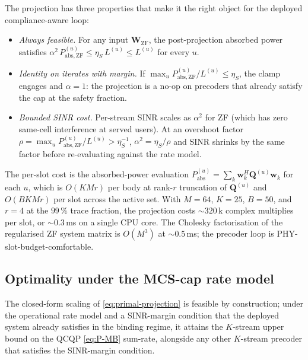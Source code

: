 \documentclass[journal,twocolumn,10pt]{IEEEtran}
\theoremstyle{plain}
\theoremstyle{remark}
\newcommand{\ww}{\mathbf{w}}
\newcommand{\Pabs}{P_{\mathrm{abs}}}
\newcommand{\Qmat}{\mathbf{Q}}
\newcommand{\WW}{\mathbf{W}}
\newcommand{\PabsZF}{P_{\mathrm{abs},\mathrm{ZF}}}
\begin{document}
The projection has three properties that make it the right object
for the deployed compliance-aware loop:

\begin{itemize}
\item \emph{Always feasible.} For any input $\WW_{\mathrm{ZF}}$,
  the post-projection absorbed power satisfies
  $\alpha^2\,\PabsZF^{(u)} \leq \eta_S\,L^{(u)} \leq
  L^{(u)}$ for every $u$.
\item \emph{Identity on iterates with margin.} If
  $\max_u \PabsZF^{(u)}/L^{(u)} \leq \eta_S$, the
  clamp engages and $\alpha = 1$: the projection is a no-op on
  precoders that already satisfy the cap at the safety fraction.
\item \emph{Bounded SINR cost.} Per-stream SINR scales as
  $\alpha^2$ for ZF (which has zero same-cell interference at
  served users). At an overshoot factor $\rho =
  \max_u \PabsZF^{(u)}/L^{(u)} > \eta_S^{-1}$,
  $\alpha^2 = \eta_S/\rho$ and SINR shrinks by the same factor
  before re-evaluating against the rate model.
\end{itemize}

The per-slot cost is the absorbed-power evaluation $\Pabs^{(u)} =
\sum_k \ww_k^H \Qmat^{(u)} \ww_k$ for each $u$, which is $O(K M r)$
per body at rank-$r$ truncation of $\Qmat^{(u)}$ and $O(B K M r)$
per slot across the active set. With $M = 64$, $K = 25$, $B = 50$,
and $r = 4$ at the $99\,\%$ trace fraction, the projection costs
$\sim 320\,$k complex multiplies per slot, or $\sim 0.3\,$ms on a
single CPU core. The Cholesky factorisation of the regularised ZF
system matrix is $O(M^3)$ at $\sim 0.5\,$ms; the precoder loop is
PHY-slot-budget-comfortable.

\subsection{Optimality under the MCS-cap rate model}\label{sec:projection-optimality}

The closed-form scaling of \cref{eq:primal-projection} is feasible
by construction; under the operational rate model and a SINR-margin
condition that the deployed system already satisfies in the
binding regime, it attains the $K$-stream upper bound on the QCQP
\cref{eq:P-MB} sum-rate, alongside any other $K$-stream precoder
that satisfies the SINR-margin condition.
\end{document}
